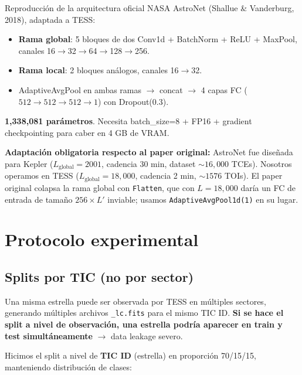 \documentclass[11pt, a4paper]{article}
\begin{document}
Reproducción de la arquitectura oficial NASA AstroNet (Shallue \& Vanderburg, 2018), adaptada a TESS:

\begin{itemize}[leftmargin=*, topsep=0pt]
    \item \textbf{Rama global}: 5 bloques de dos Conv1d + BatchNorm + ReLU + MaxPool, canales 16$\to$32$\to$64$\to$128$\to$256.
    \item \textbf{Rama local}: 2 bloques análogos, canales 16$\to$32.
    \item AdaptiveAvgPool en ambas ramas $\to$ concat $\to$ 4 capas FC ($512\to512\to512\to1$) con Dropout(0.3).
\end{itemize}

\textbf{1{,}338{,}081 parámetros}. Necesita batch\_size=8 + FP16 + gradient checkpointing para caber en 4 GB de VRAM.

\begin{keybox}
\textbf{Adaptación obligatoria respecto al paper original:} AstroNet fue diseñada para Kepler ($L_{\text{global}}=2001$, cadencia 30 min, dataset $\sim 16{,}000$ TCEs). Nosotros operamos en TESS ($L_{\text{global}}=18{,}000$, cadencia 2 min, $\sim 1576$ TOIs). El paper original colapsa la rama global con \texttt{Flatten}, que con $L=18{,}000$ daría un FC de entrada de tamaño $256 \times L'$ inviable; usamos \texttt{AdaptiveAvgPool1d(1)} en su lugar.
\end{keybox}

\section{Protocolo experimental}

\subsection{Splits por TIC (no por sector)}

Una misma estrella puede ser observada por TESS en múltiples sectores, generando múltiples archivos \texttt{\_lc.fits} para el mismo TIC ID. \textbf{Si se hace el split a nivel de observación, una estrella podría aparecer en train y test simultáneamente} $\to$ data leakage severo.

Hicimos el split a nivel de \textbf{TIC ID} (estrella) en proporción 70/15/15, manteniendo distribución de clases:
\end{document}
